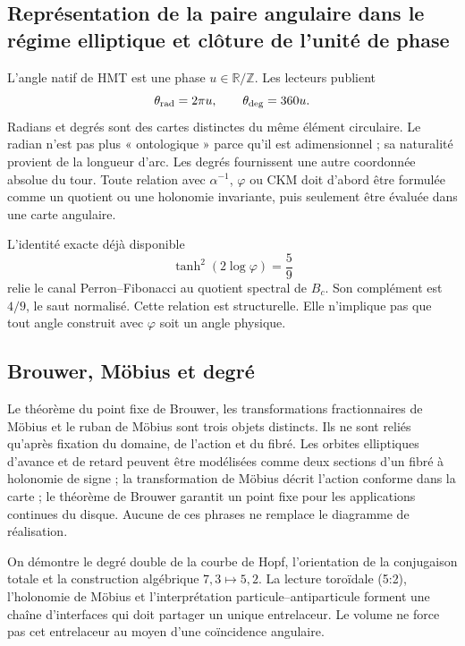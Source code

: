 \subsection{Représentation de la paire angulaire dans le régime elliptique et clôture de l'unité de phase}

L’angle natif de HMT est une phase \(u\in\mathbb R/\mathbb Z\). Les lecteurs
publient
\[
\theta_{\rm rad}=2\pi u,
\qquad
\theta_{\rm deg}=360u.
\]
Radians et degrés sont des cartes distinctes du même élément circulaire. Le radian
n’est pas plus « ontologique » parce qu’il est adimensionnel ; sa naturalité provient de la
longueur d’arc. Les degrés fournissent une autre coordonnée absolue du
tour. Toute relation avec \(\alpha^{-1}\), \(\varphi\) ou CKM doit
d’abord être formulée comme un quotient ou une holonomie invariante, puis seulement
être évaluée dans une carte angulaire.

L’identité exacte déjà disponible
\[
\tanh^2(2\log\varphi)=\frac59
\]
relie le canal Perron--Fibonacci au quotient spectral de \(B_c\). Son
complément est \(4/9\), le saut normalisé. Cette relation est structurelle.
Elle n’implique pas que tout angle construit avec \(\varphi\) soit un angle physique.

\subsection{Brouwer, Möbius et degré}

Le théorème du point fixe de Brouwer, les transformations fractionnaires de
Möbius et le ruban de Möbius sont trois objets distincts. Ils ne sont reliés
qu’après fixation du domaine, de l’action et du fibré. Les orbites elliptiques d’avance et de
retard peuvent être modélisées comme deux sections d’un fibré à holonomie de
signe ; la transformation de Möbius décrit l’action conforme dans la carte ;
le théorème de Brouwer garantit un point fixe pour les applications continues du disque.
Aucune de ces phrases ne remplace le diagramme de réalisation.

\begin{fronteraBox}[title={Résultat et frontière}]
On démontre le degré double de la courbe de Hopf, l’orientation de la
conjugaison totale et la construction algébrique \(7,3\mapsto5,2\). La lecture
toroïdale (5{:}2), l’holonomie de Möbius et l’interprétation
particule--antiparticule forment une chaîne d’interfaces qui doit partager un
unique entrelaceur. Le volume ne force pas cet entrelaceur au moyen d’une
coïncidence angulaire.
\end{fronteraBox}
